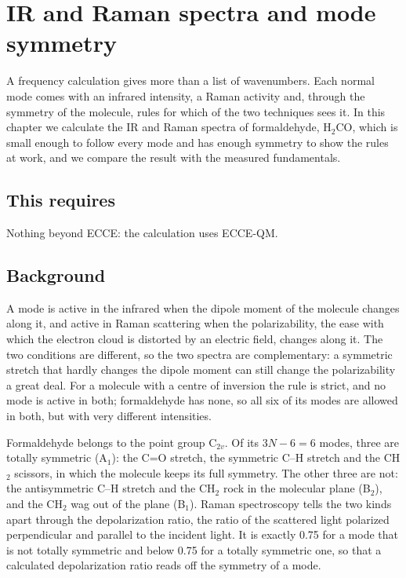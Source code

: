 \chapter{IR and Raman spectra and mode symmetry}
\label{ch:vibrations}

A frequency calculation gives more than a list of wavenumbers. Each normal mode comes with an infrared intensity, a Raman activity and, through the symmetry of the molecule, rules for which of the two techniques sees it. In this chapter we calculate the IR and Raman spectra of formaldehyde, H$_2$CO, which is small enough to follow every mode and has enough symmetry to show the rules at work, and we compare the result with the measured fundamentals.

\section*{This requires}
Nothing beyond ECCE: the calculation uses ECCE-QM.

\section{Background}
A mode is active in the infrared when the dipole moment of the molecule changes along it, and active in Raman scattering when the polarizability, the ease with which the electron cloud is distorted by an electric field, changes along it. The two conditions are different, so the two spectra are complementary: a symmetric stretch that hardly changes the dipole moment can still change the polarizability a great deal. For a molecule with a centre of inversion the rule is strict, and no mode is active in both; formaldehyde has none, so all six of its modes are allowed in both, but with very different intensities.

Formaldehyde belongs to the point group C$_{2v}$. Of its $3N - 6 = 6$ modes, three are totally symmetric (A$_1$): the C=O stretch, the symmetric C--H stretch and the CH$_2$ scissors, in which the molecule keeps its full symmetry. The other three are not: the antisymmetric C--H stretch and the CH$_2$ rock in the molecular plane (B$_2$), and the CH$_2$ wag out of the plane (B$_1$). Raman spectroscopy tells the two kinds apart through the depolarization ratio, the ratio of the scattered light polarized perpendicular and parallel to the incident light. It is exactly 0.75 for a mode that is not totally symmetric and below 0.75 for a totally symmetric one, so that a calculated depolarization ratio reads off the symmetry of a mode.

